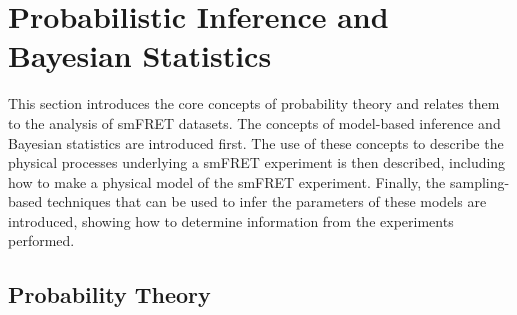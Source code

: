 




\section{Probabilistic Inference and Bayesian Statistics}
\label{sect:bayes_infer}
This section introduces the core concepts of probability theory and relates them to the analysis of smFRET datasets. The concepts of model-based inference and Bayesian statistics are introduced first. The use of these concepts to describe the physical processes underlying a smFRET experiment is then described, including how to make a physical model of the smFRET experiment. Finally, the sampling-based techniques that can be used to infer the parameters of these models are introduced, showing how to determine information from the experiments performed.   

\subsection{Probability Theory}
